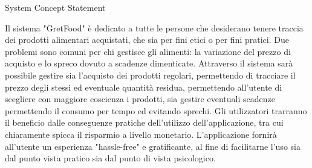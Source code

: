 System Concept Statement

Il sistema "GretFood" è dedicato a tutte le persone che desiderano tenere traccia dei prodotti alimentari acquistati, che sia per fini etici o per fini pratici.
Due problemi sono comuni per chi gestisce gli alimenti: la variazione del prezzo di acquisto e lo spreco dovuto a scadenze dimenticate.
Attraverso il sistema sarà possibile gestire sia l'acquisto dei prodotti regolari, permettendo di tracciare il prezzo degli stessi ed eventuale quantità residua, permettendo all'utente di scegliere con maggiore coscienza i prodotti, sia gestire eventuali scadenze
permettendo il consumo per tempo ed evitando sprechi. Gli utilizzatori trarranno il beneficio dalle conseguenze pratiche dell'utilizzo dell'applicazione, tra cui chiaramente spicca il risparmio a livello monetario.
L'applicazione fornirà all'utente un esperienza "hassle-free" e gratificante, al fine di facilitarne l'uso sia dal punto vista pratico sia dal punto di vista psicologico.


